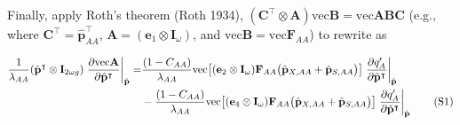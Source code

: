 \documentclass[11pt]{article}
\newcommand\numberthis{\addtocounter{equation}{1}\tag{\theequation}}
\def\mbf#1{\mathbf{#1}}
\begin{document}
\begin{landscape}
Finally, apply Roth's theorem (Roth 1934), $\left( \mbf{C}^{\intercal} \otimes \mbf{A} \right) \text{vec}\mbf{B} = \text{vec}\mbf{ABC}$ (e.g., where $\mbf{C}^{\intercal} = \hat{\mbf{p}}^{\intercal}_{AA}$, $\mbf{A} = (\mbf{e}_1 \otimes \mbf{I}_{\omega})$, and $\text{vec}\mbf{B} = \text{vec}\mbf{F}_{AA}$) to rewrite as

\begin{align*}
	\frac{1}{\lambda_{AA}}(\hat{\mbf{p}}^{\intercal} \otimes \mbf{I}_{2 \omega g}) \left. \frac{ \partial \text{vec}\mbf{A}}{\partial \hat{\mbf{p}}^{\intercal}} \right|_{\hat{\mbf{p}}} = 
		&\frac{(1 - C_{AA})}{\lambda_{AA}}  \text{vec}\big[(\mbf{e}_{2} \otimes \mbf{I}_{\omega}) \mbf{F}_{AA} \big(\hat{\mbf{p}}_{X,AA}+ \hat{\mbf{p}}_{S,AA}  \big)\big]  \left.\frac{\partial q^{\prime}_{A}}{\partial \tilde{\mbf{p}}^{\intercal}} \right|_{\hat{\mbf{p}}}  \\
		&- \frac{(1 - C_{AA})}{\lambda_{AA}}  \text{vec}\big[(\mbf{e}_{4} \otimes \mbf{I}_{\omega}) \mbf{F}_{AA} \big(\hat{\mbf{p}}_{X,AA}+ \hat{\mbf{p}}_{S,AA}  \big)\big]  \left.\frac{\partial q^{\prime}_{A}}{\partial \tilde{\mbf{p}}^{\intercal}} \right|_{\hat{\mbf{p}}}  \label{eq:partCwithpartials_app} \numberthis
\end{align*}


\end{landscape}
\end{document}
